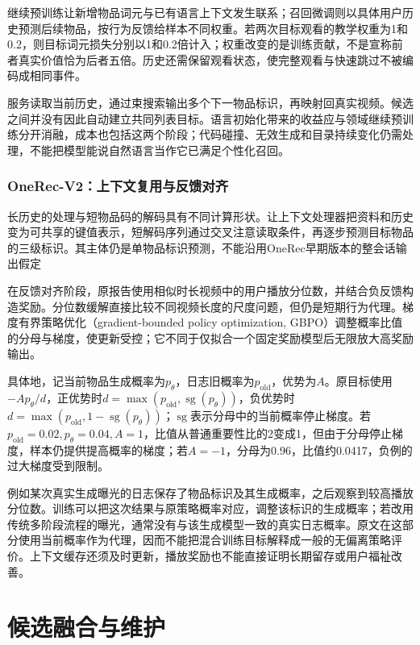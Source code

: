 继续预训练让新增物品词元与已有语言上下文发生联系；召回微调则以具体用户历史预测后续物品，按行为反馈给样本不同权重。若两次目标观看的教学权重为1和0.2，则目标词元损失分别以1和0.2倍计入；权重改变的是训练贡献，不是宣称前者真实价值恰为后者五倍。历史还需保留观看状态，使完整观看与快速跳过不被编码成相同事件。

服务读取当前历史，通过束搜索输出多个下一物品标识，再映射回真实视频。候选之间并没有因此自动建立共同列表目标。语言初始化带来的收益应与领域继续预训练分开消融，成本也包括这两个阶段；代码碰撞、无效生成和目录持续变化仍需处理，不能把模型能说自然语言当作它已满足个性化召回。

\Needspace{145mm}
\subsubsection{OneRec-V2：上下文复用与反馈对齐}
\label{sec:rs-onerec-v2}

长历史的处理与短物品码的解码具有不同计算形状。让上下文处理器把资料和历史变为可共享的键值表示，短解码序列通过交叉注意读取条件，再逐步预测目标物品的三级标识。其主体仍是单物品标识预测，不能沿用OneRec早期版本的整会话输出假定

在反馈对齐阶段，原报告使用相似时长视频中的用户播放分位数，并结合负反馈构造奖励。分位数缓解直接比较不同视频长度的尺度问题，但仍是短期行为代理。梯度有界策略优化（gradient-bounded policy optimization, GBPO）调整概率比值的分母与梯度，使更新受控；它不同于仅拟合一个固定奖励模型后无限放大高奖励输出。

具体地，记当前物品生成概率为$p_\theta$，日志旧概率为$p_{\mathrm{old}}$，优势为$A$。原目标使用$-A p_\theta/d$，正优势时$d=\max(p_{\mathrm{old}},\operatorname{sg}(p_\theta))$，负优势时$d=\max(p_{\mathrm{old}},1-\operatorname{sg}(p_\theta))$；$\operatorname{sg}$表示分母中的当前概率停止梯度。若$p_{\mathrm{old}}=0.02,p_\theta=0.04,A=1$，比值从普通重要性比的2变成1，但由于分母停止梯度，样本仍提供提高概率的梯度；若$A=-1$，分母为0.96，比值约0.0417，负例的过大梯度受到限制。

例如某次真实生成曝光的日志保存了物品标识及其生成概率，之后观察到较高播放分位数。训练可以把这次结果与原策略概率对应，调整该标识的生成概率；若改用传统多阶段流程的曝光，通常没有与该生成模型一致的真实日志概率。原文在这部分使用当前概率作为代理，因而不能把混合训练目标解释成一般的无偏离策略评价。上下文缓存还须及时更新，播放奖励也不能直接证明长期留存或用户福祉改善。

\section{候选融合与维护}
\label{sec:rs-candidate-management}

